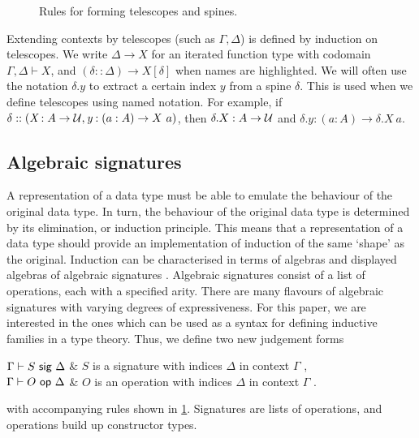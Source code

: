 \begin{figure}[H]
  \vspace{-2em}
  \caption{Rules for forming telescopes and spines.}
  \label{fig:tel-rules}
  \vspace{-1em}
\end{figure}

Extending contexts by telescopes (such as $\Gamma, \Delta$) is defined by
induction on telescopes. We write $\Delta \to X$ for an iterated function type
with codomain $\Gamma, \Delta \vdash X$, and $(\delta :: \Delta) \to X[\delta]$
when names are highlighted. We will often use the notation $\delta.y$ to extract
a certain index $y$ from a spine $\delta$. This is used when we define
telescopes using named notation. For example, if $\delta :: (\textit{X} : A \to
\mathcal{U}, \textit{y} : (a : A) \to X\ a)$, then $\delta.X : A \to \mathcal{U}$ and
$\delta.y : (a : A) \to \delta.X\ a$.


\newcommand{\ValidCase}{\mta{ValidCase}}

\subsection{Algebraic signatures}

A representation of a data type must be able to emulate the behaviour of the
original data type. In turn, the behaviour of the original data type is
determined by its elimination, or induction principle. This means that a
representation of a data type should provide an implementation of induction of
the same `shape' as the original. Induction can be characterised in terms of
algebras and displayed algebras of algebraic signatures \cite{Adamek2010-ls,Kovacs2023-gq}.
Algebraic signatures consist of a list of operations, each with a specified
arity. There are many flavours of algebraic signatures with varying degrees of
expressiveness. For this paper, we are interested in the ones which can
be used as a syntax for defining inductive families in a type theory. Thus, we define
two new judgement forms
\begin{definitions}
$\Gamma \vdash S \ \textsf{sig}\  \Delta$    & $S$ is a signature with indices $\Delta$ in context $\Gamma$ , \\
$\Gamma \vdash O \ \textsf{op}\  \Delta$     & $O$ is an operation with indices $\Delta$ in context $\Gamma$ .
\end{definitions}
with accompanying rules shown in \cref{fig:tel-rules}.
Signatures are lists of operations, and operations build up constructor types.

